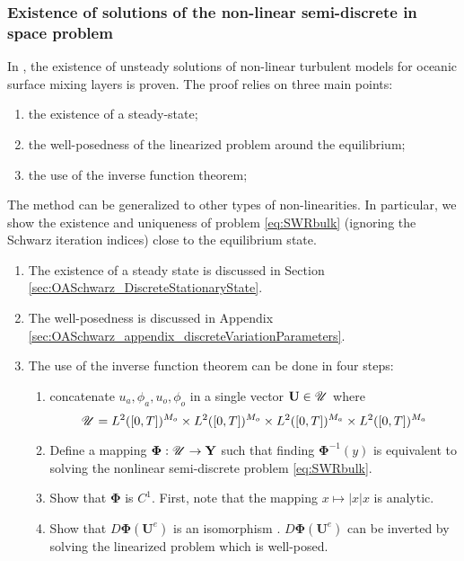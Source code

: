 \subsubsection{Existence of solutions of the
non-linear semi-discrete in space problem}
In \citep{chacon-rebollo_existence_2014},
the existence of unsteady solutions of
non-linear turbulent models for oceanic surface mixing layers is
proven.
The proof relies on three main points:
\begin{enumerate}
	\item the existence of a steady-state;
	\item the well-posedness of the linearized problem
	around the equilibrium;
	\item the use of the inverse function theorem;
\end{enumerate}
The method can be generalized to other types of
non-linearities. In particular, we show the existence and
uniqueness of problem \eqref{eq:SWRbulk}
(ignoring the Schwarz iteration indices) close to the
equilibrium state.
\begin{enumerate}
	\item The existence of a steady state is discussed in
	Section \ref{sec:OASchwarz_DiscreteStationaryState}.
	\item The well-posedness is discussed in Appendix
	\ref{sec:OASchwarz_appendix_discreteVariationParameters}.
	\item The use of the inverse function theorem can be
		done in four steps:
	\begin{enumerate}
		\item concatenate $u_a, \phi_a, u_o, \phi_o$ in
		a single vector $\mathbf{U}\in \mathbf{\cal U}$
		where
		\begin{equation}
			\mathbf{\cal U} = L^2([0,T])^{M_o} \times
			L^2([0,T])^{M_o} \times L^2([0,T])^{M_a}
			\times L^2([0,T])^{M_a}
		\end{equation}
		\item
		Define a mapping
		$\mathbf{\Phi}: \mathbf{\cal U}\rightarrow \mathbf{Y}$
		such that finding $\mathbf{\Phi}^{-1}(y)$ is equivalent
		to solving the nonlinear semi-discrete problem
			\eqref{eq:SWRbulk}.
		\item Show that $\mathbf{\Phi}$ is $C^1$.
			First, note that the mapping
			$x \mapsto |x|x$ is analytic.
		\item Show that $D\mathbf{\Phi}(\mathbf{U}^e)$
			is an isomorphism .
		$D\mathbf{\Phi}(\mathbf{U}^e)$ can
		be inverted by solving the linearized problem which
		is well-posed.
	\end{enumerate}
\end{enumerate}
